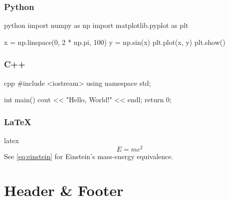 		\subsubsection{Python}
{\vspace{10pt}
	\label{lst:python}
	\vspace{-4pt}}
\begin{codelisting}{python}
	import numpy as np
	import matplotlib.pyplot as plt
	
	x = np.linspace(0, 2 * np.pi, 100)
	y = np.sin(x)
	plt.plot(x, y)
	plt.show()
\end{codelisting}
		
		\subsubsection{C++}
{\vspace{10pt}
	\label{lst:cpp}
	\vspace{-4pt}}
\begin{codelisting}{cpp}
	#include <iostream>
	using namespace std;
	
	int main() {
		cout << "Hello, World!" << endl;
		return 0;
	}
\end{codelisting}
		
		\subsubsection{LaTeX}
{\vspace{10pt}
	\label{lst:latex}
	\vspace{-4pt}}
\begin{codelisting}{latex}
	\begin{equation} %
		E = mc^2
		\label{eq:einstein}
	\end{equation}
	See \cref{eq:einstein} for Einstein's mass-energy equivalence.
\end{codelisting}

\section{Header \& Footer}

